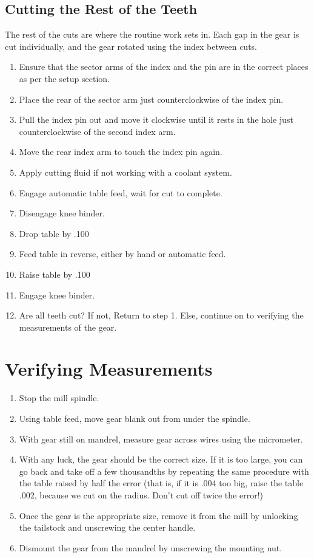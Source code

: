 \documentclass[12pt,twoside,letterpaper]{article}
\begin{document}
\subsection{Cutting the Rest of the Teeth}
The rest of the cuts are where the routine work sets in. Each gap in the gear is cut individually, and the gear rotated using the index between cuts. 
\begin{enumerate}
\item Ensure that the sector arms of the index and the pin are in the correct places as per the setup section.
\item Place the rear of the sector arm just counterclockwise of the index pin.
\item Pull the index pin out and move it clockwise until it rests in the hole just counterclockwise of the second index arm.
\item Move the rear index arm to touch the index pin again.
\item Apply cutting fluid if not working with a coolant system.
\item Engage automatic table feed, wait for cut to complete.
\item Disengage knee binder.
\item Drop table by .100
\item Feed table in reverse, either by hand or automatic feed.
\item Raise table by .100
\item Engage knee binder.
\item Are all teeth cut? If not, Return to step 1. Else, continue on to verifying the measurements of the gear.
\end{enumerate}

\section{Verifying Measurements}

\begin{enumerate}
\item Stop the mill spindle.
\item Using table feed, move gear blank out from under the spindle.
\item With gear still on mandrel, measure gear across wires using the micrometer.
\item With any luck, the gear should be the correct size. If it is too large, you can go back and take off a few thousandths by repeating the same procedure with the table raised by half the error (that is, if it is .004 too big, raise the table .002, because we cut on the radius. Don't cut off twice the error!) 
\item Once the gear is the appropriate size, remove it from the mill by unlocking the tailstock and unscrewing the center handle.
\item Dismount the gear from the mandrel by unscrewing the mounting nut.

\end{enumerate}
\end{document}
